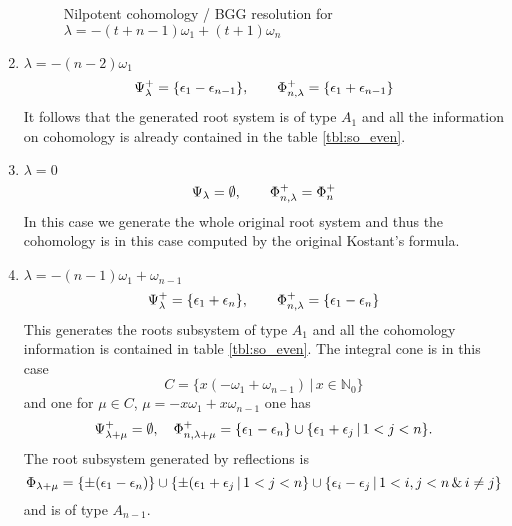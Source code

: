 \documentclass[12pt,a4paper,final]{report}
\begin{document}
\begin{enumerate}
\begin{figure}[H]
  \caption{Nilpotent cohomology / BGG resolution for $\lambda = -(t+n-1)\omega_1 + (t+1)\omega_n$}
\end{figure}
 \item $ \lambda = -(n-2)\omega_1$\\
\[\Psi^+_\lambda = \{ \epsilon_1 - \epsilon_{n-1} \}, \qquad \Phi^+_{n,\lambda} = \{ \epsilon_1 + \epsilon_{n-1} \}\] It  follows that the generated root system is of type $A_1$ and all the information on cohomology is already contained in the table \ref{tbl:so_even}. 
 \item $ \lambda = 0$\\
\[\Psi_\lambda = \emptyset, \qquad \Phi^+_{n,\lambda} = \Phi^+_n\]
In this case we generate the whole original root system and thus the cohomology is in this case computed by the original Kostant's formula.   
 \item $ \lambda = -(n-1)\omega_1  + \omega_{n-1}$\\
\[ \Psi^+_\lambda = \{\epsilon_1 +\epsilon_n \}, \qquad \Phi^+_{n,\lambda} = \{\epsilon_1 - \epsilon_n \}\]
 This generates the roots subsystem of type $A_1$ and all the cohomology information is contained in table \ref{tbl:so_even}. The integral cone is in this case \[C = \{x(-\omega_1 + \omega_{n-1}) \,|\, x\in\mathbb{N}_0 \}\] and one for $\mu  \in C$, $\mu = -x\omega_1 + x\omega_{n-1}$ one has
  \[
   \Psi^+_{\lambda + \mu} = \emptyset, \quad \Phi^+_{n,\lambda+\mu} = \{ \epsilon_1 - \epsilon_n \} \cup \{\epsilon_1 + \epsilon_j \,|\, 1<j<n \}.
  \]
  The root subsystem generated by reflections is
  \[
   \Phi_{\lambda + \mu} = \{\pm(\epsilon_1-\epsilon_n)\} \cup \{\pm(\epsilon_1 + \epsilon_j \,|\, 1<j<n\} \cup \{ \epsilon_i - \epsilon_j \,|\, 1<i,j<n \,\&\, i \neq j\}
  \]
  and is of type $A_{n-1}$.
\begin{figure}[H]
  \centering
{}
\end{figure}
\end{enumerate}
\end{document}

